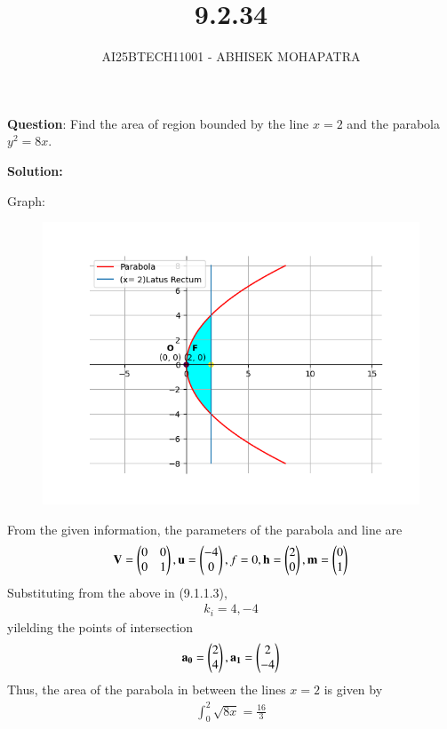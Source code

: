 \documentclass[journal,12pt,onecolumn]{IEEEtran}
\begin{document}
\title{9.2.34}
\author{AI25BTECH11001 - ABHISEK MOHAPATRA}
{\let\newpage\relax\maketitle}
	
	 	\textbf{Question}:
Find the area of region bounded by the line $x = 2$ and the parabola $y^2 = 8x$.

		\textbf{Solution:}

	Graph:
\begin{figure}[h!]
	\centering
	\includegraphics[width=0.7\linewidth]{img.png}
\end{figure}

From the given information, the parameters of the parabola and line are
\begin{align}
		\mathbf{V} = \begin{pmatrix}0&0\\0&1\end{pmatrix}, \mathbf{u} = \begin{pmatrix}-4\\0\end{pmatrix} , f = 0, \mathbf{h} =\begin{pmatrix}2\\0\end{pmatrix}, \mathbf{m}=\begin{pmatrix}0\\1\end{pmatrix} 
\end{align}
Substituting from the above in (9.1.1.3),
\begin{align}
k_i=4,-4
\end{align}
yilelding the points of intersection
\begin{align}
		\mathbf{a_0}=\begin{pmatrix}2\\4\end{pmatrix},\mathbf{a_1}=\begin{pmatrix}2\\-4\end{pmatrix}
\end{align}
Thus, the area of the parabola in between the lines $x = 2$ is given by
\begin{align}
\int_0^2 \sqrt{8x} = \frac{16}{3}
\end{align}
\end{document}
